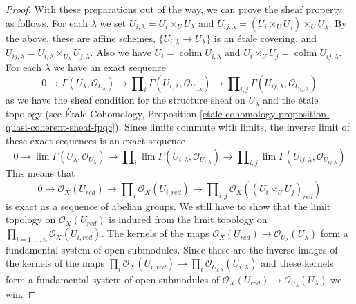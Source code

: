 \documentclass{stacks-project}
\theoremstyle{plain}
\theoremstyle{definition}
\theoremstyle{remark}
\numberwithin{equation}{subsection}
\def\lim{\mathop{\mathrm{lim}}\nolimits}
\def\colim{\mathop{\mathrm{colim}}\nolimits}
\begin{document}
\begin{proof}
\medskip\noindent
With these preparations out of the way, we can prove the sheaf
property as follows. For each $\lambda$ we set
$U_{i, \lambda} = U_i \times_U U_\lambda$ and
$U_{ij, \lambda} = (U_i \times_U U_j) \times_U U_\lambda$.
By the above, these are affine schemes, $\{U_{i, \lambda} \to U_\lambda\}$
is an \'etale covering, and
$U_{ij, \lambda} = U_{i, \lambda} \times_{U_\lambda} U_{j, \lambda}$.
Also we have $U_i = \colim U_{i, \lambda}$ and
$U_i \times_U U_j = \colim U_{ij, \lambda}$.
For each $\lambda$ we have an exact sequence
$$
0 \to
\Gamma(U_\lambda, \mathcal{O}_{U_\lambda}) \to
\prod\nolimits_i \Gamma(U_{i, \lambda}, \mathcal{O}_{U_{i, \lambda}}) \to
\prod\nolimits_{i, j} \Gamma(U_{ij, \lambda}, \mathcal{O}_{U_{ij, \lambda}})
$$
as we have the sheaf condition for the structure sheaf
on $U_\lambda$ and the \'etale topology
(see \'Etale Cohomology, Proposition
\ref{etale-cohomology-proposition-quasi-coherent-sheaf-fpqc}).
Since limits commute with limits, the inverse limit of these
exact sequences is an exact sequence
$$
0 \to
\lim \Gamma(U_\lambda, \mathcal{O}_{U_\lambda}) \to
\prod\nolimits_i \lim \Gamma(U_{i, \lambda}, \mathcal{O}_{U_{i, \lambda}}) \to
\prod\nolimits_{i, j} \lim
\Gamma(U_{ij, \lambda}, \mathcal{O}_{U_{ij, \lambda}})
$$
This means that
$$
0 \to
\mathcal{O}_X(U_{red}) \to
\prod\nolimits_i \mathcal{O}_X(U_{i, red}) \to
\prod\nolimits_{i, j} \mathcal{O}_X((U_i \times_U U_j)_{red})
$$
is exact as a sequence of abelian groups. We still have to
show that the limit topology on $\mathcal{O}_X(U_{red})$ is induced
from the limit topology on
$\prod_{i = 1, \ldots, n} \mathcal{O}_X(U_{i, red})$.
The kernels of the maps
$\mathcal{O}_X(U_{red}) \to \mathcal{O}_{U_\lambda}(U_\lambda)$
form a fundamental system of open submodules. Since these are the inverse
images of the kernels of the maps
$\prod_i \mathcal{O}_X(U_{i, red}) \to
\prod_i \mathcal{O}_{U_{i, \lambda}}(U_{i, \lambda})$
and these kernels form a fundamental system of open submodules
of $\mathcal{O}_X(U_{red}) \to \mathcal{O}_{U_\lambda}(U_\lambda)$
we win.
\end{proof}
\end{document}
